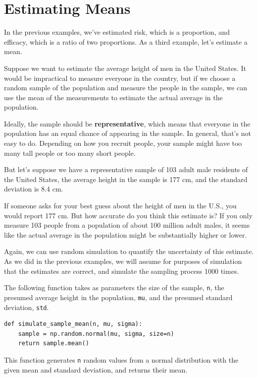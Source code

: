 \hypertarget{estimating-means}{%
\section{Estimating Means}\label{estimating-means}}

In the previous examples, we've estimated risk, which is a proportion,
and efficacy, which is a ratio of two proportions. As a third example,
let's estimate a mean.

Suppose we want to estimate the average height of men in the United
States. It would be impractical to measure everyone in the country, but
if we choose a random sample of the population and measure the people in
the sample, we can use the mean of the measurements to estimate the
actual average in the population.

Ideally, the sample should be \textbf{representative}, which means that
everyone in the population has an equal chance of appearing in the
sample. In general, that's not easy to do. Depending on how you recruit
people, your sample might have too many tall people or too many short
people.

But let's suppose we have a representative sample of 103 adult male
residents of the United States, the average height in the sample is 177
cm, and the standard deviation is 8.4 cm.

If someone asks for your best guess about the height of men in the U.S.,
you would report 177 cm. But how accurate do you think this estimate is?
If you only measure 103 people from a population of about 100 million
adult males, it seems like the actual average in the population might be
substantially higher or lower.

Again, we can use random simulation to quantify the uncertainty of this
estimate. As we did in the previous examples, we will assume for
purposes of simulation that the estimates are correct, and simulate the
sampling process 1000 times.

The following function takes as parameters the size of the sample,
\passthrough{\lstinline!n!}, the presumed average height in the
population, \passthrough{\lstinline!mu!}, and the presumed standard
deviation, \passthrough{\lstinline!std!}.

\begin{lstlisting}[]
def simulate_sample_mean(n, mu, sigma):
    sample = np.random.normal(mu, sigma, size=n)
    return sample.mean()
\end{lstlisting}

This function generates \passthrough{\lstinline!n!} random values from a
normal distribution with the given mean and standard deviation, and
returns their mean.

